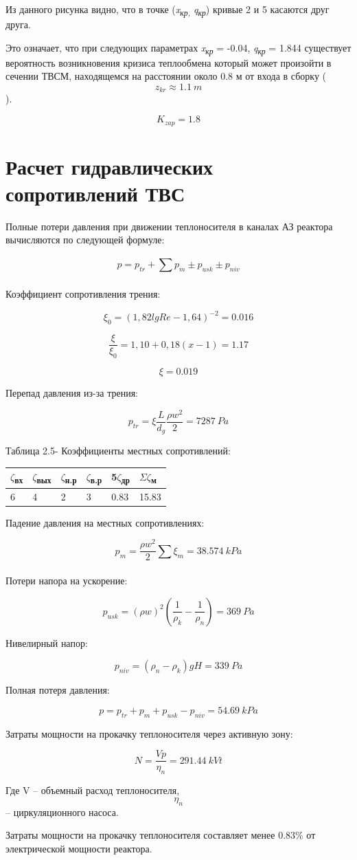 Из данного рисунка видно, что в точке (\emph{x\textsubscript{кр,}
q\textsubscript{кр}}) кривые 2 и 5 касаются друг друга.

Это означает, что при следующих параметрах \emph{x\textsubscript{кр}} =
-0.04, \emph{q\textsubscript{кр}} = 1.844 существует вероятность
возникновения кризиса теплообмена который может произойти в сечении
ТВСМ, находящемся на расстоянии около 0.8 м от входа в сборку
(\[z_{kr} \approx 1.1\ m\]).

\[K_{zap} = 1.8\]

\section{Расчет гидравлических сопротивлений ТВС}

Полные потери давления при движении теплоносителя в каналах АЗ реактора
вычисляются по следующей формуле:

\[p = p_{tr} + \sum_{}^{}{p_{m} \pm p_{usk} \pm p_{niv}}\]

Коэффициент сопротивления трения:

\[\xi_{0} = {(1,82lgRe - 1,64)}^{- 2} = 0.016\]

\[\frac{\xi}{\xi_{0}} = 1,10 + 0,18\left( x - 1 \right) = 1.17\]

\[\xi = 0.019\]

Перепад давления из-за трения:

\[p_{tr} = \xi\frac{L}{d_{g}}\frac{\rho w^{2}}{2} = 7287\ Pa\]

Таблица 2.5- Коэффициенты местных сопротивлений:

\begin{longtable}[]{@{}llllll@{}}
\toprule
$\zeta$\textsubscript{вх} & $\zeta$\textsubscript{вых} & $\zeta$\textsubscript{н.р} &
$\zeta$\textsubscript{в.р} & 5$\zeta$\textsubscript{др} &
$\Sigma$$\zeta$\textsubscript{м}\tabularnewline
\midrule
\endhead
6 & 4 & 2 & 3 & 0.83 & 15.83\tabularnewline
\bottomrule
\end{longtable}

Падение давления на местных сопротивлениях:

\[p_{m} = \frac{\rho w^{2}}{2}\sum_{}^{}{\xi_{m} = 38.574\ kPa}\]

Потери напора на ускорение:

\[p_{usk} = \left( \rho w \right)^{2}\left( \frac{1}{\rho_{k}} - \frac{1}{\rho_{n}} \right) = 369\ Pa\]

Нивелирный напор:

\[p_{niv} = \left( \rho_{n} - \rho_{k} \right)gH = 339\ Pa\]

Полная потеря давления:

\[p = p_{tr} + p_{m} + p_{usk} - p_{niv} = 54.69\ kPa\]

Затраты мощности на прокачку теплоносителя через активную зону:

\[N = \frac{Vp}{\eta_{n}} = 291.44\ kVt\]

Где V -- объемный расход теплоносителя, \[\eta_{n}\] -- 
циркуляционного насоса.

Затраты мощности на прокачку теплоносителя составляет менее 0.83\% от
электрической мощности реактора.
